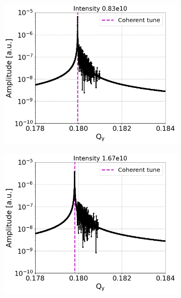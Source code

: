 \begin{figure}[htp]
\begin{subfigure}{.45\textwidth}
        \label{fig:study_9b}
    \end{subfigure}
    \begin{subfigure}{.45\textwidth}
        \centering
        \includegraphics[width=.95\linewidth]{images/Ch7/fft_sps_forSchottky_tbt_270GeV_PN1e-8_WakesON_ayy6000_QpxQpy0_6D_Nb1e4_InialOffsetY1e-4m_turns1e6_IntensityScan_intensity0.83e10.png}  
        \label{fig:study_9c}
    \end{subfigure}
    \begin{subfigure}{.45\textwidth}
        \centering
        \includegraphics[width=.95\linewidth]{images/Ch7/fft_sps_forSchottky_tbt_270GeV_PN1e-8_WakesON_ayy6000_QpxQpy0_6D_Nb1e4_InialOffsetY1e-4m_turns1e6_IntensityScan_intensity1.67e10.png}  

\end{subfigure}
\end{figure}
